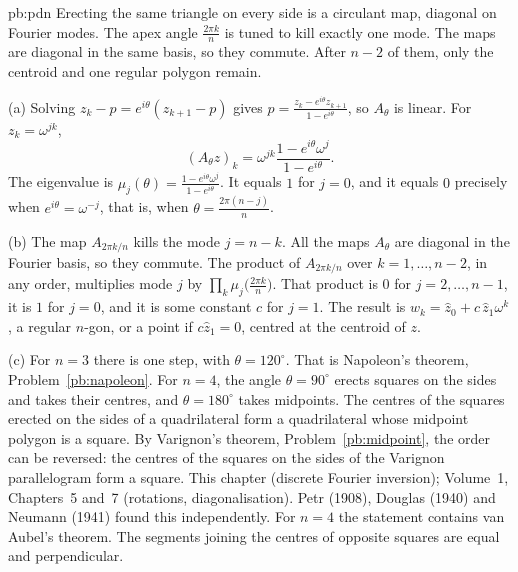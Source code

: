 \begin{solution}{pb:pdn}
\idea Erecting the same triangle on every side is a circulant map, diagonal on Fourier modes. The apex angle $\frac{2\pi k}n$ is tuned to kill exactly one mode. The maps are diagonal in the same basis, so they commute. After $n-2$ of them, only the centroid and one regular polygon remain.

\writeup (a) Solving $z_k-p=e^{i\theta}(z_{k+1}-p)$ gives $p=\frac{z_k-e^{i\theta}z_{k+1}}{1-e^{i\theta}}$, so $A_\theta$ is linear. For $z_k=\omega^{jk}$,
\[
(A_\theta z)_k=\omega^{jk}\frac{1-e^{i\theta}\omega^j}{1-e^{i\theta}}.
\]
The eigenvalue is $\mu_j(\theta)=\frac{1-e^{i\theta}\omega^j}{1-e^{i\theta}}$. It equals $1$ for $j=0$, and it equals $0$ precisely when $e^{i\theta}=\omega^{-j}$, that is, when $\theta=\frac{2\pi(n-j)}n$.

(b) The map $A_{2\pi k/n}$ kills the mode $j=n-k$. All the maps $A_\theta$ are diagonal in the Fourier basis, so they commute. The product of $A_{2\pi k/n}$ over $k=1,\ldots,n-2$, in any order, multiplies mode $j$ by $\prod_k\mu_j\bigl(\frac{2\pi k}n\bigr)$. That product is $0$ for $j=2,\ldots,n-1$, it is $1$ for $j=0$, and it is some constant $c$ for $j=1$. The result is $w_k=\hat z_0+c\,\hat z_1\omega^k$, a regular $n$-gon, or a point if $c\hat z_1=0$, centred at the centroid of $z$.

(c) For $n=3$ there is one step, with $\theta=120^\circ$. That is Napoleon's theorem, Problem~\ref{pb:napoleon}. For $n=4$, the angle $\theta=90^\circ$ erects squares on the sides and takes their centres, and $\theta=180^\circ$ takes midpoints. The centres of the squares erected on the sides of a quadrilateral form a quadrilateral whose midpoint polygon is a square. By Varignon's theorem, Problem~\ref{pb:midpoint}, the order can be reversed: the centres of the squares on the sides of the Varignon parallelogram form a square.
\tools This chapter (discrete Fourier inversion); Volume~1, Chapters~5 and~7 (rotations, diagonalisation).
\leads Petr (1908), Douglas (1940) and Neumann (1941) found this independently. For $n=4$ the statement contains van Aubel's theorem. The segments joining the centres of opposite squares are equal and perpendicular.
\end{solution}

